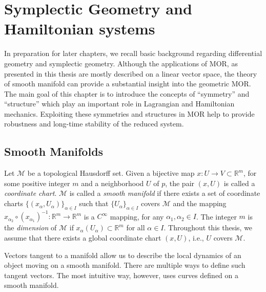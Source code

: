 \chapter{Symplectic Geometry and Hamiltonian systems} \label{chapter:2}

In preparation for later chapters, we recall basic background regarding differential geometry and symplectic geometry. Although the applications of MOR, as presented in this thesis are mostly described on a linear vector space, the theory of smooth manifold can provide a substantial insight into the geometric MOR. The main goal of this chapter is to introduce the concepts of ``symmetry'' and ``structure'' which play an important role in Lagrangian and Hamiltonian mechanics. Exploiting these symmetries and structures in MOR help to provide robustness and long-time stability of the reduced system.

\section{Smooth Manifolds} \label{section:2.1}
Let $\mathcal M$ be a topological Hausdorff \cite{friedman1970foundations} set. Given a bijective map $x:U\to V\subset \mathbb R^{m}$, for some positive integer $m$ and a neighborhood $U$ of $p$, the pair $(x,U)$ is called a \emph{coordinate chart}. $\mathcal M$ is called a \emph{smooth manifold} if there exists a set of coordinate charts $\{(x_{\alpha},U_{\alpha})\}_{\alpha\in I}$ such that $\{U_{\alpha}\}_{\alpha\in I}$ covers $\mathcal M$ and the mapping $x_{\alpha_2}\circ (x_{\alpha_1})^{-1}:\mathbb R^{m} \to \mathbb R^{m}$ is a $C^{\infty}$ mapping, for any $\alpha_1,\alpha_2\in I$. The integer $m$ is the \emph{dimension} of $\mathcal M$ if $x_{\alpha}(U_{\alpha}) \subset \mathbb R^{m}$ for all $\alpha \in I$. Throughout this thesis, we assume that there exists a global coordinate chart $(x,U)$, i.e., $U$ covers $\mathcal M$.

Vectors tangent to a manifold allow us to describe the local dynamics of an object moving on a smooth manifold. There are multiple ways to define such tangent vectors. The most intuitive way, however, uses curves defined on a smooth manifold.

